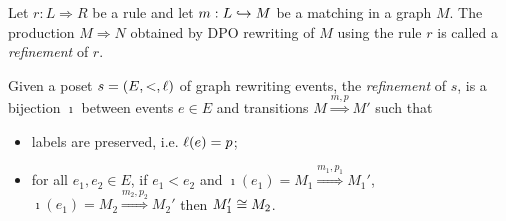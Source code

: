\begin{definition}
  Let $r:L{\Rightarrow} R$ be a rule and let $m:L\hookrightarrow M$ be a matching in a graph $M$. The production $M\Rightarrow N$ obtained by DPO rewriting of $M$ using the rule $r$ is called a \emph{refinement} of $r$.
\end{definition}

\begin{definition}
  Given a poset $s=(E,<,\ell)$ of graph rewriting events, the \emph{refinement} of $s$, is a bijection $\imath$ between events $e\in E$ and transitions $M\overset{m,p}{\Rightarrow} M'$ such that
  \begin{itemize}
  \item labels are preserved, i.e. $\ell(e)=p$;
  \item  for all $e_1,e_2\in E$, if $e_1<e_2$ and $\imath(e_1) = M_1\overset{m_1,p_1}{\Rightarrow} M_1'$, $\imath(e_1) =M_2\overset{m_2,p_2}{\Rightarrow} M_2'$ then $M_1'\cong M_2$.
  \end{itemize}
\end{definition}



